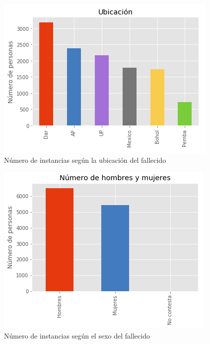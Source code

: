 \documentclass[10pt,a4paper]{article}
\begin{document}
\begin{itemize}
\begin{figure}
  \includegraphics[width=\linewidth]{figures/plot_ubicacion.png}
  \caption{Número de instancias según la ubicación del fallecido}
  \label{fig:loc_graph}
\end{figure}  

\begin{figure}
  \includegraphics[width=\linewidth]{figures/plot_sexo.png}
  \caption{Número de instancias según el sexo del fallecido}
  \label{fig:sex_graph}
\end{figure}  
    

\end{itemize}
\end{document}
